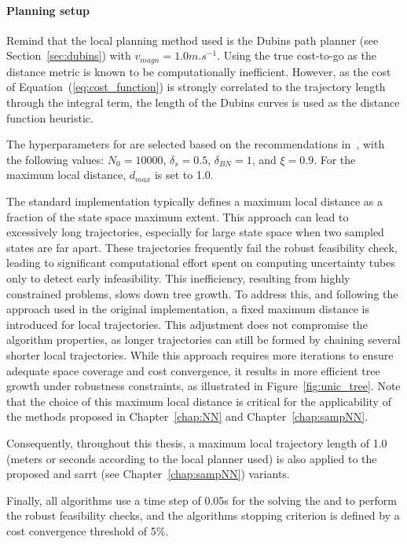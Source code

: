 \paragraph{Planning setup}

Remind that the local planning method used is the Dubins path planner (see Section~\ref{sec:dubins}) with $v_{magn} = 1.0 m.s^{-1}$. 
Using the true cost-to-go as the distance metric is known to be computationally inefficient. 
However, as the cost of Equation~(\ref{eq:cost_function}) is strongly correlated to the trajectory length through the integral term, the length of the Dubins curves is used as the distance function heuristic. 

The hyperparameters for  are selected based on the recommendations in~\cite{cSST}, with the following values: $N_0 = 10000$, $\delta_s = 0.5$, $\delta_{BN} = 1$, and $\xi = 0.9$.
For the maximum local distance, $d_{max}$ is set to 1.0.

The standard   implementation typically defines a maximum local distance as a fraction of the state space maximum extent.
This approach can lead to excessively long trajectories, especially for large state space when two sampled states are far apart.
These trajectories frequently fail the robust feasibility check, leading to significant computational effort spent on computing uncertainty tubes only to detect early infeasibility. 
This inefficiency, resulting from highly constrained problems, slows down tree growth.
To address this, and following the approach used in the original  implementation, a fixed maximum distance is introduced for local trajectories. 
This adjustment does not compromise the algorithm properties, as longer trajectories can still be formed by chaining several shorter local trajectories. 
While this approach requires more iterations to ensure adequate space coverage and cost convergence, it results in more efficient tree growth under robustness constraints, as illustrated in Figure~\ref{fig:unic_tree}.
Note that the choice of this maximum local distance is critical for the applicability of the methods proposed in Chapter~\ref{chap:NN} and Chapter~\ref{chap:sampNN}.

Consequently, throughout this thesis, a maximum local trajectory length of 1.0 (meters or seconds according to the local planner used) is also applied to the proposed  and \gls{sarrt} (see Chapter~\ref{chap:sampNN}) variants.

Finally, all algorithms use a time step of 0.05s for the solving the  and to perform the robust feasibility checks, and the algorithms stopping criterion is defined by a cost convergence threshold of 5\%.

